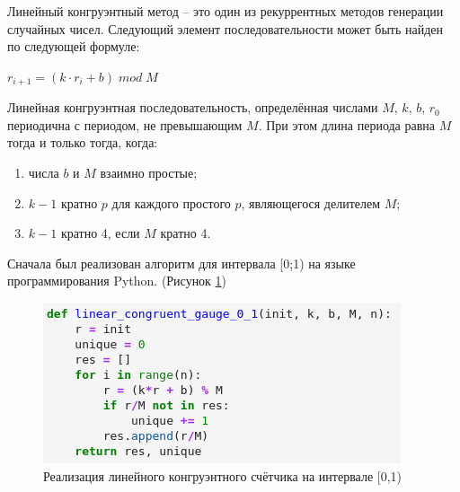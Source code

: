 \documentclass[14pt,fleqn]{extarticle}
\begin{document}
    Линейный конгруэнтный метод -- это один из рекуррентных методов генерации случайных чисел. Следующий элемент последовательности может быть найден по следующей формуле:
    \begin{center}
        $ r_{i+1} = (k \cdot r_i + b) \; mod \; M$
    \end{center}
    
    Линейная конгруэнтная последовательность, определённая числами $M$, $k$, $b$, $r_0$ периодична с периодом, не превышающим $M$. При этом длина периода равна $M$ тогда и только тогда, когда:
    \begin{enumerate}[topsep=0pt,itemsep=-1ex,partopsep=1ex,parsep=1ex]
        \item числа $b$ и $M$ взаимно простые;
        \item $k-1$ кратно $p$ для каждого простого $p$, являющегося делителем $M$;
        \item $k-1$ кратно 4, если $M$ кратно 4.
    \end{enumerate}
    Сначала был реализован алгоритм для интервала [0;1) на языке программирования Python. (Рисунок \ref{fig:linear_congruent_gauge_0_1_code})
    \begin{figure}[h]
        \centering \includegraphics[scale=0.8]{linear_congruent_gauge_0_1_code}
        \caption{Реализация линейного конгруэнтного счётчика на интервале [0,1)}
        \label{fig:linear_congruent_gauge_0_1_code}
    \end{figure}
\end{document}
